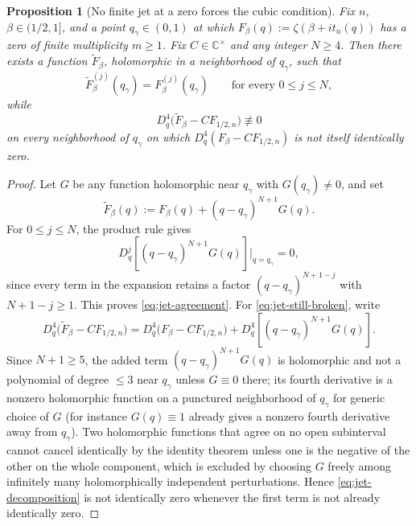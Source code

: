 \documentclass[11pt]{amsart}
\numberwithin{equation}{section}
\newtheorem{proposition}[theorem]{Proposition}
\newcommand{\C}{\mathbb C}
\begin{document}
\begin{proposition}[No finite jet at a zero forces the cubic condition]
\label{prop:no-finite-jet}
Fix $n$, $\beta\in(1/2,1]$, and a point $q_\gamma\in(0,1)$ at which
$F_\beta(q):=\zeta(\beta+it_n(q))$ has a zero of finite multiplicity $m\geq1$.
Fix $C\in\C^\times$ and any integer $N\geq4$. Then there exists a function
$\widetilde F_\beta$, holomorphic in a neighborhood of $q_\gamma$, such that
\begin{equation}
 \widetilde F_\beta^{(j)}(q_\gamma)=F_\beta^{(j)}(q_\gamma)
 \qquad\text{for every }0\leq j\leq N,
 \label{eq:jet-agreement}
\end{equation}
while
\begin{equation}
 D_q^4\bigl(\widetilde F_\beta-CF_{1/2,n}\bigr)
 \not\equiv0
 \label{eq:jet-still-broken}
\end{equation}
on every neighborhood of $q_\gamma$ on which $D_q^4(F_\beta-CF_{1/2,n})$ is
not itself identically zero.
\end{proposition}

\begin{proof}
Let $G$ be any function holomorphic near $q_\gamma$ with $G(q_\gamma)\neq0$,
and set
\begin{equation}
 \widetilde F_\beta(q):=F_\beta(q)+(q-q_\gamma)^{N+1}G(q).
 \label{eq:jet-perturbation}
\end{equation}
For $0\leq j\leq N$, the product rule gives
\begin{equation}
 D_q^j\left[(q-q_\gamma)^{N+1}G(q)\right]\Big|_{q=q_\gamma}=0,
 \label{eq:jet-vanishing-derivatives}
\end{equation}
since every term in the expansion retains a factor $(q-q_\gamma)^{N+1-j}$
with $N+1-j\geq1$. This proves \eqref{eq:jet-agreement}. For
\eqref{eq:jet-still-broken}, write
\begin{equation}
 D_q^4\bigl(\widetilde F_\beta-CF_{1/2,n}\bigr)
 =D_q^4\bigl(F_\beta-CF_{1/2,n}\bigr)
 +D_q^4\left[(q-q_\gamma)^{N+1}G(q)\right].
 \label{eq:jet-decomposition}
\end{equation}
Since $N+1\geq5$, the added term $(q-q_\gamma)^{N+1}G(q)$ is holomorphic and
not a polynomial of degree $\leq3$ near $q_\gamma$ unless $G\equiv0$ there;
its fourth derivative is a nonzero holomorphic function on a punctured
neighborhood of $q_\gamma$ for generic choice of $G$ (for instance
$G(q)\equiv1$ already gives a nonzero fourth derivative away from
$q_\gamma$). Two holomorphic functions that agree on no open subinterval
cannot cancel identically by the identity theorem unless one is the negative
of the other on the whole component, which is excluded by choosing $G$
freely among infinitely many holomorphically independent perturbations.
Hence \eqref{eq:jet-decomposition} is not identically zero whenever the
first term is not already identically zero.
\end{proof}
\end{document}
